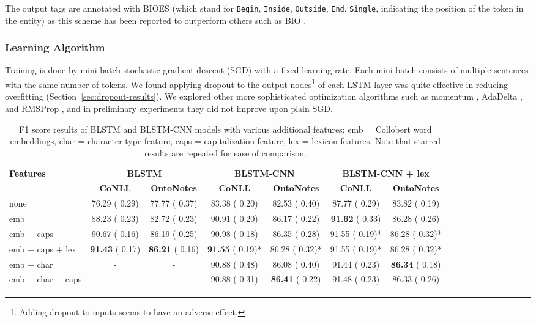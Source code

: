 \documentclass[11pt,letterpaper]{article}
\begin{document}
The output tags are annotated with BIOES (which stand for {\tt Begin}, 
{\tt Inside}, {\tt Outside}, {\tt End}, {\tt Single}, indicating the position of the token in the entity) as this scheme has been reported to outperform others such as BIO \cite{ratinov2009}.

\subsubsection{Learning Algorithm}

Training is done by mini-batch stochastic gradient descent (SGD) with a fixed learning rate. Each mini-batch consists of multiple sentences with the same number of tokens. 
We found applying dropout to the output nodes\footnote{Adding dropout to inputs seems to have an adverse effect.} of each LSTM layer \cite{pham2014} was quite effective in reducing overfitting (Section~\ref{sec:dropout-results}).
We explored other more sophisticated optimization algorithms such as momentum \cite{nesterov1983}, AdaDelta \cite{zeiler2012}, and RMSProp \cite{hinton2012}, and in preliminary experiments they did not improve upon plain SGD. 



\begin{table*}[ht!]
\begin{center}
\footnotesize
\begin{tabular}{|l|c|c|c|c|c|c|}
\hline 
\multirow{2}{*}{\bf Features} & \multicolumn{2}{|c|}{\bf BLSTM} & \multicolumn{2}{|c|}{\bf BLSTM-CNN} & \multicolumn{2}{|c|}{\bf BLSTM-CNN + lex} \\ \cline{2-7}
& \bf CoNLL & \bf OntoNotes & \bf CoNLL & \bf OntoNotes & \bf CoNLL & \bf OntoNotes\\ \hline
none & 76.29 ( 0.29) & 77.77 ( 0.37) & 83.38 ( 0.20) & 82.53 ( 0.40) & 87.77 ( 0.29) & 83.82 ( 0.19) \\
emb & 88.23 ( 0.23) & 82.72 ( 0.23) & 90.91 ( 0.20) & 86.17 ( 0.22) & {\bf 91.62} ( 0.33) & 86.28 ( 0.26) \\
emb + caps       & 90.67 ( 0.16) & 86.19 ( 0.25) & 90.98 ( 0.18) & 86.35 ( 0.28) & 91.55 ( 0.19)* & 86.28 ( 0.32)* \\
emb + caps + lex & {\bf 91.43} ( 0.17) & {\bf 86.21} ( 0.16) & {\bf 91.55} ( 0.19)* & 86.28 ( 0.32)* & 91.55 ( 0.19)* & 86.28 ( 0.32)* \\ \hline
emb + char & \-- & \-- & 90.88 ( 0.48) & 86.08 ( 0.40) & 91.44 ( 0.23) & {\bf 86.34} ( 0.18) \\
emb + char + caps & \-- & \-- & 90.88 ( 0.31) & {\bf 86.41} ( 0.22) & 91.48 ( 0.23) & 86.33 ( 0.26) \\ \hline

\end{tabular}
\end{center}
\caption{F1 score results of BLSTM and BLSTM-CNN models with various additional features; emb = Collobert word embeddings, char = character type feature, caps = capitalization feature, lex = lexicon features. Note that starred results are repeated for ease of comparison.}
\label{tab:res-feat-no-cnn}
\end{table*}
\end{document}
